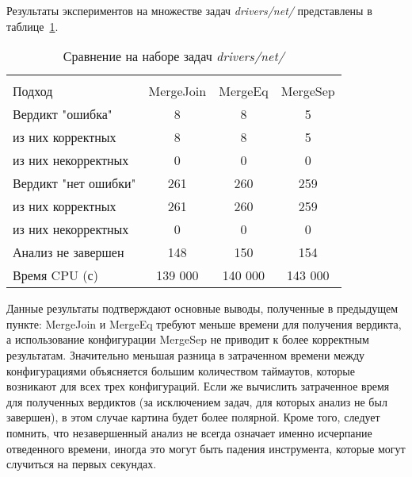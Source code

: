 Результаты экспериментов на множестве задач \textit{drivers/net/} представлены в таблице~\ref{table-drivers-merge}.

  \begin{table}[h]\footnotesize \centering
    \caption{Сравнение на наборе задач \textit{drivers/net/}}
  	\label{table-drivers-merge}
    \begin{tabular}{ | l | c | c | c | }
      \hline
      		& 		\multicolumn{3}{c|}{\theoryraces}  \\
      Подход         				& MergeJoin	& MergeEq 	& MergeSep   \\ \hline
      Вердикт "ошибка" 				& 8	    	& 8  		& 5         \\ 
  \hspace{0.5cm} из них корректных 	& 8 		& 8 		& 5      \\ 
  \hspace{0.5cm} из них некорректных & 0 		& 0 		& 0        \\ \hline
      Вердикт "нет ошибки"  		& 261      	& 260       & 259       \\ 
  \hspace{0.5cm} из них корректных 	& 261 		& 260    	& 259        \\
  \hspace{0.5cm} из них некорректных & 0 		& 0    		& 0         \\ \hline
      Анализ не завершен       		& 148     	& 150        & 154       \\ \hline
      Время CPU (с)   				& 139 000 	& 140 000    & 143 000    \\ 
      \hline
    \end{tabular}
  \end{table}

Данные результаты подтверждают основные выводы, полученные в предыдущем пункте: MergeJoin и MergeEq требуют меньше времени для получения вердикта, а использование конфигурации MergeSep не приводит к более корректным результатам. 
Значительно меньшая разница в затраченном времени между конфигурациями объясняется большим количеством таймаутов, которые возникают для всех трех конфигураций. 
Если же вычислить затраченное время для полученных вердиктов (за исключением задач, для которых анализ не был завершен), в этом случае картина будет более полярной.
Кроме того, следует помнить, что незавершенный анализ не всегда означает именно исчерпание отведенного времени, иногда это могут быть падения инструмента, которые могут случиться на первых секундах.


